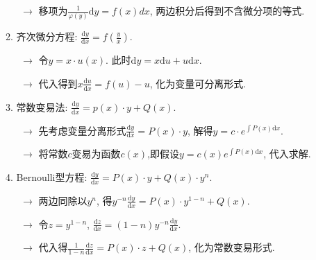 ~~~$\rightarrow$ 移项为$\frac{1}{\varphi(y)}\mathrm{d}y=f(x)dx$, 两边积分后得到不含微分项的等式.

2. 齐次微分方程: $\frac{\mathrm{d}y}{\mathrm{d}x}=f(\frac{y}{x})$. 

~~~$\rightarrow$ 令$y=x\cdot u(x).$ 此时$\mathrm{d}y=x\mathrm{d}u+u\mathrm{d}x$.

~~~$\rightarrow$ 代入得到$x\frac{\mathrm{d}u}{\mathrm{d}x}=f(u)-u$, 化为变量可分离形式.

3. 常数变易法: $\frac{\mathrm{d}y}{\mathrm{d}x}=p(x)\cdot y+Q(x)$. 

~~~$\rightarrow$ 先考虑变量分离形式$\frac{\mathrm{d}y}{\mathrm{d}x}=P(x)\cdot y$, 解得$y=c\cdot e^{\int P(x) \mathrm{d} x}$.

~~~$\rightarrow$ 将常数$c$变易为函数$c(x)$,即假设$y=c(x)e^{\int P(x) \mathrm{d}x}$, 代入求解.

4. Bernoulli型方程: $\frac{\mathrm{d}y}{\mathrm{d}x}=P(x)\cdot y+Q(x)\cdot y^n$.

~~~$\rightarrow$ 两边同除以$y^n$, 得$y^{-n}\frac{\mathrm{d}y}{\mathrm{d}x}=P(x)\cdot y^{1-n}+Q(x)$.

~~~$\rightarrow$ 令$z=y^{1-n}$, $\frac{\mathrm{d}z}{\mathrm{d}x}=(1-n)y^{-n}\frac{\mathrm{d}y}{\mathrm{d}x}$.

~~~$\rightarrow$ 代入得$\frac{1}{1-n}\frac{\mathrm{d}z}{\mathrm{d}x}=P(x)\cdot z+Q(x)$, 化为常数变易形式.